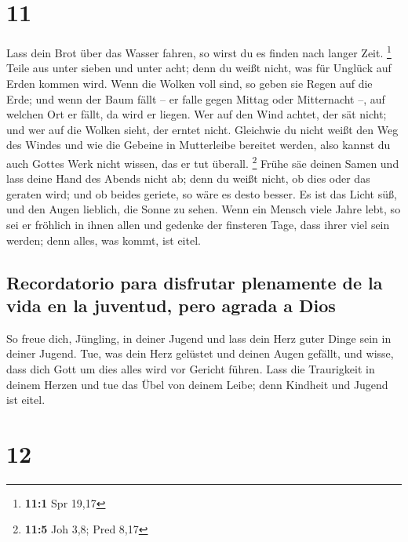 \hypertarget{section-10}{%
\section{11}\label{section-10}}

 Lass dein Brot über das Wasser fahren, so wirst du es
finden nach langer Zeit. \footnote{\textbf{11:1} Spr 19,17}
 Teile aus unter sieben und unter acht; denn du weißt
nicht, was für Unglück auf Erden kommen wird.  Wenn die
Wolken voll sind, so geben sie Regen auf die Erde; und wenn der Baum
fällt -- er falle gegen Mittag oder Mitternacht --, auf welchen Ort er
fällt, da wird er liegen.  Wer auf den Wind achtet, der
sät nicht; und wer auf die Wolken sieht, der erntet nicht.
 Gleichwie du nicht weißt den Weg des Windes und wie die
Gebeine in Mutterleibe bereitet werden, also kannst du auch Gottes Werk
nicht wissen, das er tut überall. \footnote{\textbf{11:5} Joh 3,8; Pred
  8,17}  Frühe säe deinen Samen und lass deine Hand des
Abends nicht ab; denn du weißt nicht, ob dies oder das geraten wird; und
ob beides geriete, so wäre es desto besser.  Es ist das
Licht süß, und den Augen lieblich, die Sonne zu sehen. 
Wenn ein Mensch viele Jahre lebt, so sei er fröhlich in ihnen allen und
gedenke der finsteren Tage, dass ihrer viel sein werden; denn alles, was
kommt, ist eitel.

\hypertarget{recordatorio-para-disfrutar-plenamente-de-la-vida-en-la-juventud-pero-agrada-a-dios}{%
\subsection{Recordatorio para disfrutar plenamente de la vida en la
juventud, pero agrada a
Dios}\label{recordatorio-para-disfrutar-plenamente-de-la-vida-en-la-juventud-pero-agrada-a-dios}}

 So freue dich, Jüngling, in deiner Jugend und lass dein
Herz guter Dinge sein in deiner Jugend. Tue, was dein Herz gelüstet und
deinen Augen gefällt, und wisse, dass dich Gott um dies alles wird vor
Gericht führen.  Lass die Traurigkeit in deinem Herzen
und tue das Übel von deinem Leibe; denn Kindheit und Jugend ist eitel.

\hypertarget{section-11}{%
\section{12}\label{section-11}}

